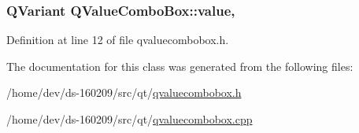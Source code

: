 \subsubsection[{value}]{\setlength{\rightskip}{0pt plus 5cm}Q\+Variant Q\+Value\+Combo\+Box\+::value\hspace{0.3cm}{\ttfamily [read]}, {\ttfamily [write]}}\label{class_q_value_combo_box_ac487ee6027e1b8b7c211f95d60c45f7c}


Definition at line 12 of file qvaluecombobox.\+h.



The documentation for this class was generated from the following files\+:\begin{DoxyCompactItemize}
\item 
/home/dev/ds-\/160209/src/qt/\hyperlink{qvaluecombobox_8h}{qvaluecombobox.\+h}\item 
/home/dev/ds-\/160209/src/qt/\hyperlink{qvaluecombobox_8cpp}{qvaluecombobox.\+cpp}\end{DoxyCompactItemize}
